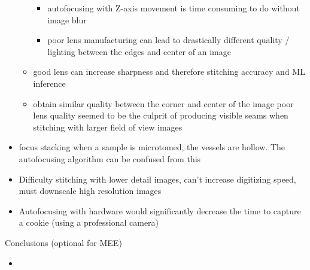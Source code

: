 \documentclass{article}
\begin{document}
\begin{outline}[itemize]
\begin{itemize}
\begin{itemize}
\begin{itemize}
				\item autofocusing with Z-axis movement is time consuming to do without image blur
				\item poor lens manufacturing can lead to drastically different quality / lighting between the edges and center of an image
				\end{itemize}
			\item good lens can increase sharpness and therefore stitching accuracy and ML inference
			\item obtain similar quality between the corner and center of the image
			\subitem poor lens quality seemed to be the culprit of producing visible seams when stitching with larger field of view images 
			\end{itemize}

		\item focus stacking
		\subitem when a sample is microtomed, the vessels are hollow. The autofocusing algorithm can be confused from this 
		\item Difficulty stitching with lower detail images, can't increase digitizing speed, must downscale high resolution images 
		\item Autofocusing with hardware would significantly decrease the time to capture a cookie (using a professional camera)
	\end{itemize}
\item Conclusions (optional for MEE)
	\begin{itemize}
	\item
	\end{itemize}
        
\end{outline}
\end{document}
